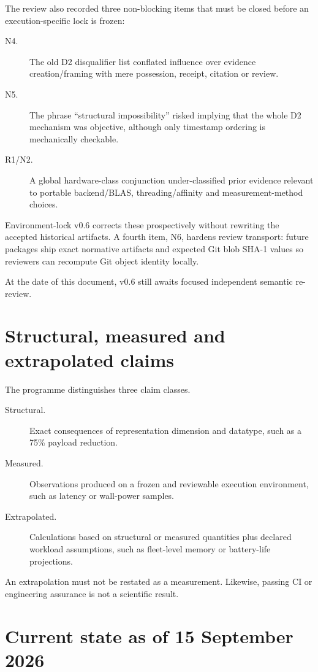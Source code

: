 \documentclass[10pt,a4paper]{article}
\begin{document}
The review also recorded three non-blocking items that must be closed before an execution-specific lock is
frozen:

\begin{description}
\item[N4.] The old D2 disqualifier list conflated influence over evidence creation/framing with mere possession,
receipt, citation or review.
\item[N5.] The phrase ``structural impossibility'' risked implying that the whole D2 mechanism was objective,
although only timestamp ordering is mechanically checkable.
\item[R1/N2.] A global hardware-class conjunction under-classified prior evidence relevant to portable backend/BLAS,
threading/affinity and measurement-method choices.
\end{description}

Environment-lock v0.6 corrects these prospectively without rewriting the accepted historical artifacts.
A fourth item, N6, hardens review transport: future packages ship exact normative artifacts and expected Git blob
SHA-1 values so reviewers can recompute Git object identity locally.

At the date of this document, v0.6 still awaits focused independent semantic re-review.

\section{Structural, measured and extrapolated claims}

The programme distinguishes three claim classes.

\begin{description}
\item[Structural.] Exact consequences of representation dimension and datatype, such as a 75\% payload reduction.
\item[Measured.] Observations produced on a frozen and reviewable execution environment, such as latency or wall-power samples.
\item[Extrapolated.] Calculations based on structural or measured quantities plus declared workload assumptions, such as
fleet-level memory or battery-life projections.
\end{description}

An extrapolation must not be restated as a measurement. Likewise, passing CI or engineering assurance is not a
scientific result.

\section{Current state as of 15 September 2026}
\end{document}
